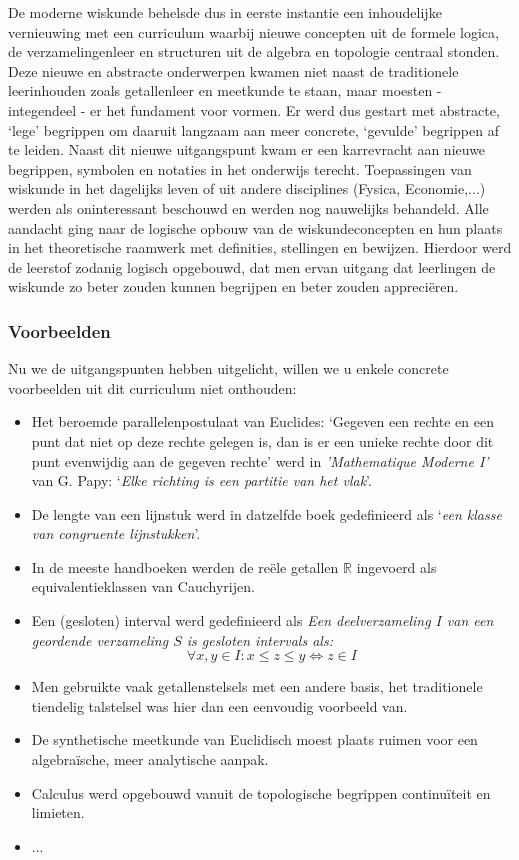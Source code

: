 \documentclass[a4paper,11pt]{article}
\newcommand{\R}{{\mathbb R}}
\begin{document}
\noindent De moderne wiskunde behelsde dus in eerste instantie een inhoudelijke 
vernieuwing met een curriculum waarbij nieuwe concepten uit de formele logica, de verzamelingenleer en 
structuren uit de algebra en topologie centraal stonden. Deze nieuwe en abstracte onderwerpen 
kwamen niet naast de traditionele leerinhouden zoals getallenleer en meetkunde te staan, 
maar moesten - integendeel - er het fundament voor vormen. Er werd dus gestart met 
abstracte, `lege' begrippen om daaruit langzaam aan meer concrete, `gevulde' 
begrippen af te leiden. Naast dit nieuwe uitgangspunt kwam er een karrevracht 
aan nieuwe begrippen, symbolen en notaties in het onderwijs terecht. 
Toepassingen van wiskunde in het dagelijks leven of uit andere disciplines (Fysica, Economie,...)
werden als oninteressant beschouwd en werden nog nauwelijks behandeld. Alle 
aandacht ging naar de logische opbouw van de wiskundeconcepten en hun plaats in 
het theoretische raamwerk met definities, stellingen en bewijzen. Hierdoor werd de leerstof zodanig logisch opgebouwd, 
dat men ervan uitgang dat leerlingen de wiskunde zo beter zouden kunnen 
begrijpen en beter zouden appreciëren.

\subsubsection{Voorbeelden}
Nu we de uitgangspunten hebben uitgelicht, willen we u enkele concrete 
voorbeelden uit dit curriculum niet onthouden:

\begin{itemize}
  \item Het beroemde parallelenpostulaat van Euclides: `Gegeven een rechte 
  en een punt dat niet op deze rechte gelegen is, dan is er een unieke rechte 
  door dit punt evenwijdig aan de gegeven rechte' werd in \textit{'Mathematique Moderne I'} van 
  G. Papy: `\textit{Elke richting is een partitie van het vlak}'.
  \item De lengte van een lijnstuk werd in datzelfde boek gedefinieerd als 
  `\textit{een klasse van congruente lijnstukken}'.
  \item In de meeste handboeken werden de reële getallen $\R$ ingevoerd als 
  equivalentieklassen van Cauchyrijen.
  \item Een (gesloten) interval werd gedefinieerd als \textit{Een deelverzameling $I$ van 
  een geordende verzameling $S$ is gesloten intervals als:
  $$\forall x, y \in I: x \leq z \leq y \Leftrightarrow z \in I$$}
  \item Men gebruikte vaak getallenstelsels met een andere basis, het 
  traditionele tiendelig talstelsel was hier dan een eenvoudig voorbeeld van.
  \item De synthetische meetkunde van Euclidisch moest plaats ruimen voor 
  een algebraïsche, meer analytische aanpak.
  \item Calculus werd opgebouwd vanuit de topologische begrippen continuïteit
  en limieten.
  \item ...
  
  \end{itemize}
\end{document}
